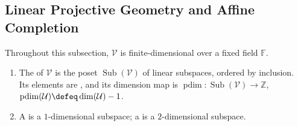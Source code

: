 \subsection{Linear Projective Geometry and Affine Completion}

Throughout this subsection, $\mathcal{V}$ is finite-dimensional over a fixed field $\mathbb{F}$.

\begin{definition} \label{def:projective-geometry-vector-space} 
\begin{enumerate}[label=(\roman*)]
\setlength{\itemsep}{0pt}
\item The  of $\mathcal{V}$ is the poset $\operatorname{Sub}(\mathcal{V})$ of linear subspaces, ordered by inclusion.\\
Its elements are , and its dimension map is $\operatorname{pdim}:\operatorname{Sub}(\mathcal{V})\to\mathbb{Z}$, $\operatorname{pdim}(\mathcal{U})\defeq\dim(\mathcal{U})-1$.
\item A  is a $1$-dimensional subspace; a  is a $2$-dimensional subspace.
\end{enumerate}
\end{definition}

